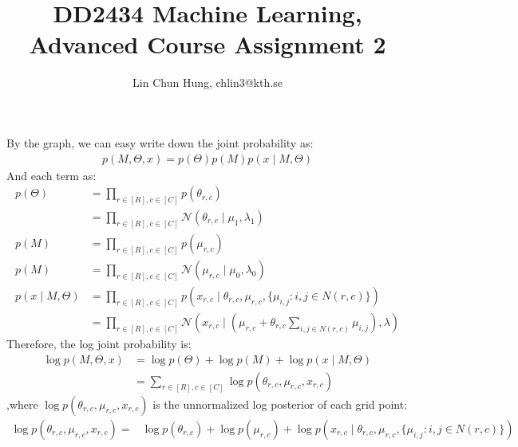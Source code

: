 \documentclass[12pt]{article}
\newenvironment{problem}[2][Problem]{\begin{trivlist}
\item[\hskip \labelsep {\bfseries #1}\hskip \labelsep {\bfseries #2.}]}{\end{trivlist}}
\begin{document}
 
 
\title{DD2434 Machine Learning, Advanced Course Assignment 2}
\author{Lin Chun Hung, chlin3@kth.se}
\maketitle

\begin{problem}{2.9.25}
By the graph, we can easy write down the joint probability as:
\begin{align*}
    p(M, \Theta, x) = p(\Theta)p(M)p(x \mid M, \Theta)
\end{align*}
And each term as:
\begin{align*}
    p(\Theta) &= \prod_{r \in [R], c\in [C]} p(\theta_{r,c}) \\
        &= \prod_{r \in [R], c\in [C]} \mathcal{N}(\theta_{r,c}\mid \mu_{1}, \lambda_{1}) \\
    p(M) &= \prod_{r \in [R], c\in [C]} p(\mu_{r,c}) \\
    p(M) &= \prod_{r \in [R], c\in [C]} \mathcal{N}(\mu_{r,c}\mid \mu_{0}, \lambda_{0}) \\
    p(x \mid M, \Theta) &= \prod_{r \in [R], c\in [C]} 
                p(x_{r,c}\mid \theta_{r,c}, \mu_{r,c}, \{\mu_{i,j}: i, j \in N(r,c)\})\\
        &= \prod_{r \in [R], c\in [C]} \mathcal{N}(x_{r,c} \mid  
            (\mu_{r,c} + \theta_{r,c}\sum_{i,j \in N(r,c)}\mu_{i,j}), \lambda)
\end{align*}
Therefore, the log joint probability is:
\begin{align*}
    \log p(M, \Theta, x) &= \log p(\Theta) + \log p(M) + \log p(x \mid M, \Theta) \\
        & = \sum_{r \in [R], c\in [C]} \log p(\theta_{r,c}, \mu_{r,c}, x_{r,c})
\end{align*}
,where $\log p(\theta_{r,c}, \mu_{r,c}, x_{r,c})$ is the unnormalized log posterior
of each grid point:
\begin{align*}
    \log p(\theta_{r,c}, \mu_{r,c}, x_{r,c}) =& 
    \log p(\theta_{r,c}) + \log p(\mu_{r,c}) 
        + \log p(x_{r,c}\mid \theta_{r,c}, \mu_{r,c}, \{\mu_{i,j}: i, j \in N(r,c)\}) \\

\end{align*}
\end{problem}
\end{document}
